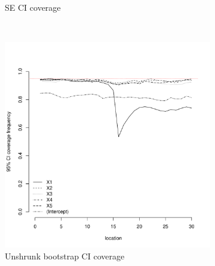 \documentclass[authoryear, review, 11pt]{elsarticle}
\begin{document}
\begin{figure}
\begin{subfigure}[b]{0.45\textwidth}
		\caption{SE CI coverage}
	\end{subfigure}%
	\\%
	\begin{subfigure}[b]{0.45\textwidth}
	\centering
		\includegraphics[width=\textwidth]{../../figures/simulation/15.21.profile_unshrunk_bootstrap_coverage.pdf}
		\caption{Unshrunk bootstrap CI coverage}
	\end{subfigure}%
	~ %
	\begin{subfigure}[b]{0.45\textwidth}
	\centering

\end{subfigure}
\end{figure}
\end{document}
